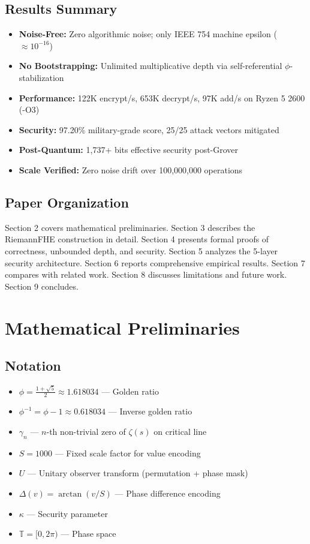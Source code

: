 \documentclass[11pt,a4paper]{article}
\theoremstyle{remark}
\begin{document}
\subsection{Results Summary}

\begin{itemize}
    \item \textbf{Noise-Free:} Zero algorithmic noise; only IEEE 754 machine epsilon ($\approx 10^{-16}$)
    \item \textbf{No Bootstrapping:} Unlimited multiplicative depth via self-referential $\phi$-stabilization
    \item \textbf{Performance:} 122K encrypt/s, 653K decrypt/s, 97K add/s on Ryzen 5 2600 (-O3)
    \item \textbf{Security:} 97.20\% military-grade score, 25/25 attack vectors mitigated
    \item \textbf{Post-Quantum:} 1,737+ bits effective security post-Grover
    \item \textbf{Scale Verified:} Zero noise drift over 100,000,000 operations
\end{itemize}

\subsection{Paper Organization}

Section 2 covers mathematical preliminaries. Section 3 describes the RiemannFHE construction in detail. Section 4 presents formal proofs of correctness, unbounded depth, and security. Section 5 analyzes the 5-layer security architecture. Section 6 reports comprehensive empirical results. Section 7 compares with related work. Section 8 discusses limitations and future work. Section 9 concludes.

\section{Mathematical Preliminaries}

\subsection{Notation}

\begin{itemize}
    \item $\phi = \frac{1+\sqrt{5}}{2} \approx 1.618034$ — Golden ratio
    \item $\phi^{-1} = \phi - 1 \approx 0.618034$ — Inverse golden ratio
    \item $\gamma_n$ — $n$-th non-trivial zero of $\zeta(s)$ on critical line
    \item $S = 1000$ — Fixed scale factor for value encoding
    \item $U$ — Unitary observer transform (permutation + phase mask)
    \item $\Delta(v) = \arctan(v/S)$ — Phase difference encoding
    \item $\kappa$ — Security parameter
    \item $\mathbb{T} = [0, 2\pi)$ — Phase space
\end{itemize}
\end{document}
